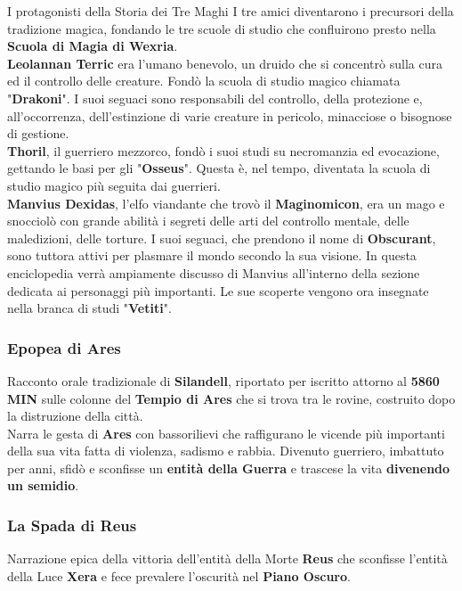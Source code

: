 \documentclass[10pt,twoside,onecolumn,openany]{book}
\begin{document}
\begin{commentbox}{{I protagonisti della Storia dei Tre Maghi}}
I tre amici diventarono i precursori della tradizione magica, fondando le tre scuole di studio che confluirono presto nella \textbf{Scuola di Magia di Wexria}.\\
\textbf{Leolannan Terric} era l'umano benevolo, un druido che si concentrò sulla cura ed il controllo delle creature. Fondò la scuola di studio magico chiamata "\textbf{Drakoni}". I suoi seguaci sono responsabili del controllo, della protezione e, all'occorrenza, dell'estinzione di varie creature in pericolo, minacciose o bisognose di gestione.\\
\textbf{Thoril}, il guerriero mezzorco, fondò i suoi studi su necromanzia ed evocazione, gettando le basi per gli "\textbf{Osseus}". Questa è, nel tempo, diventata la scuola di studio magico più seguita dai guerrieri.\\
\textbf{Manvius Dexidas}, l'elfo viandante che trovò il \textbf{Maginomicon}, era un mago e snocciolò con grande abilità i segreti delle arti del controllo mentale, delle maledizioni, delle torture. I suoi seguaci, che prendono il nome di \textbf{Obscurant}, sono tuttora attivi per plasmare il mondo secondo la sua visione. In questa enciclopedia verrà ampiamente discusso di Manvius all'interno della sezione dedicata ai personaggi più importanti. Le sue scoperte vengono ora insegnate nella branca di studi "\textbf{Vetiti}".\\
\end{commentbox}
\newpage
\subsubsection{Epopea di Ares} Racconto orale tradizionale di \textbf{Silandell}, riportato per iscritto attorno al \textbf{5860 MIN} sulle colonne del \textbf{Tempio di Ares} che si trova tra le rovine, costruito dopo la distruzione della città.\\
Narra le gesta di \textbf{Ares} con bassorilievi che raffigurano le vicende più importanti della sua vita fatta di violenza, sadismo e rabbia. Divenuto guerriero, imbattuto per anni, sfidò e sconfisse un \textbf{entità della Guerra} e trascese la vita \textbf{divenendo un semidio}.
\subsubsection{La Spada di Reus}
Narrazione epica della vittoria dell'entità della Morte \textbf{Reus} che sconfisse l'entità della Luce \textbf{Xera} e fece prevalere l'oscurità nel \textbf{Piano Oscuro}.
\end{document}

